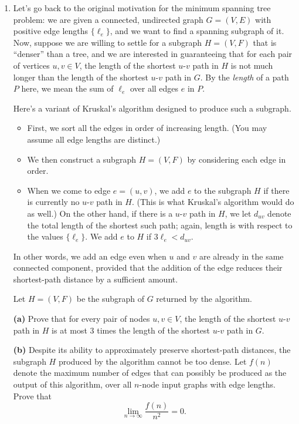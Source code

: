\documentclass[12pt]{article}
\begin{document}
\begin{enumerate}
{}


\item 

Let's go back to the original motivation for the minimum spanning
tree problem: we are given a connected, undirected graph
$G = (V,E)$ with positive edge lengths $\{\ell_e\}$, and we want
to find a spanning subgraph of it.
Now, suppose we are willing to settle for a subgraph $H = (V,F)$
that is ``denser'' than a tree, and we are interested
in guaranteeing that for each pair of vertices $u, v \in V$,
the length of the shortest $u$-$v$ path in $H$
is not much longer than the length of the shortest
$u$-$v$ path in $G$.
By the {\em length} of a path $P$ here,
we mean the sum of $\ell_e$ over all edges $e$ in $P$.

Here's a variant of Kruskal's algorithm designed to produce such a subgraph.
\begin{itemize}
\item First, we sort all the edges in order of increasing length.
(You may assume all edge lengths are distinct.)
\item We then construct a subgraph $H = (V,F)$ by
considering each edge in order.
\item When we come to edge $e = (u,v)$,
we add $e$ to the subgraph $H$ if there is currently
no $u$-$v$ path in $H$.
(This is what Kruskal's algorithm would do as well.)
On the other hand, if there is a $u$-$v$ path in $H$,
we let $d_{uv}$ denote the total length of the shortest such path;
again, length is with respect to the values $\{\ell_e\}$.
We add $e$ to $H$ if $3 \ell_e < d_{uv}$.
\end{itemize}
In other words, we add an edge even when $u$ and $v$ are
already in the same connected component, provided that
the addition of the edge reduces their shortest-path distance
by a sufficient amount.

Let $H = (V,F)$ be the subgraph of $G$ returned by the algorithm.

\medskip
{\bf (a)} Prove that for every pair of nodes $u, v \in V$,
the length of the shortest $u$-$v$ path in $H$
is at most $3$ times the length of the
shortest $u$-$v$ path in $G$.

\medskip
{\bf (b)\Star} Despite its ability to approximately preserve
shortest-path distances, the subgraph $H$ produced
by the algorithm cannot be too dense.
Let $f(n)$ denote the maximum number of edges
that can possibly be produced as the output of this algorithm,
over all $n$-node input graphs with edge lengths.
Prove that $$\lim_{n \rightarrow \infty} \frac{f(n)}{n^2} = 0.$$


\end{enumerate}
\end{document}
